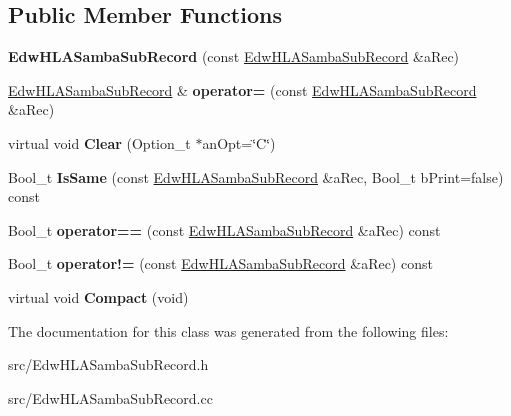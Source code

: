 \subsection*{Public Member Functions}
\begin{DoxyCompactItemize}
\item 
\hypertarget{class_edw_h_l_a_samba_sub_record_a42fa97a57160c365e2309866e46c6986}{
{\bfseries EdwHLASambaSubRecord} (const \hyperlink{class_edw_h_l_a_samba_sub_record}{EdwHLASambaSubRecord} \&aRec)}
\label{class_edw_h_l_a_samba_sub_record_a42fa97a57160c365e2309866e46c6986}

\item 
\hypertarget{class_edw_h_l_a_samba_sub_record_a88374b44b2522626b0dca8b9eec053c6}{
\hyperlink{class_edw_h_l_a_samba_sub_record}{EdwHLASambaSubRecord} \& {\bfseries operator=} (const \hyperlink{class_edw_h_l_a_samba_sub_record}{EdwHLASambaSubRecord} \&aRec)}
\label{class_edw_h_l_a_samba_sub_record_a88374b44b2522626b0dca8b9eec053c6}

\item 
\hypertarget{class_edw_h_l_a_samba_sub_record_a265688e7ce89606b981957bf6ac3acb5}{
virtual void {\bfseries Clear} (Option\_\-t $\ast$anOpt=\char`\"{}C\char`\"{})}
\label{class_edw_h_l_a_samba_sub_record_a265688e7ce89606b981957bf6ac3acb5}

\item 
\hypertarget{class_edw_h_l_a_samba_sub_record_a74965b85f1c9782fc5260badd87c91af}{
Bool\_\-t {\bfseries IsSame} (const \hyperlink{class_edw_h_l_a_samba_sub_record}{EdwHLASambaSubRecord} \&aRec, Bool\_\-t bPrint=false) const }
\label{class_edw_h_l_a_samba_sub_record_a74965b85f1c9782fc5260badd87c91af}

\item 
\hypertarget{class_edw_h_l_a_samba_sub_record_a78615ac3f95ed3df5a0bcafabc2c1b11}{
Bool\_\-t {\bfseries operator==} (const \hyperlink{class_edw_h_l_a_samba_sub_record}{EdwHLASambaSubRecord} \&aRec) const }
\label{class_edw_h_l_a_samba_sub_record_a78615ac3f95ed3df5a0bcafabc2c1b11}

\item 
\hypertarget{class_edw_h_l_a_samba_sub_record_a053a38ee6e024cd83bc600e1cccf17d8}{
Bool\_\-t {\bfseries operator!=} (const \hyperlink{class_edw_h_l_a_samba_sub_record}{EdwHLASambaSubRecord} \&aRec) const }
\label{class_edw_h_l_a_samba_sub_record_a053a38ee6e024cd83bc600e1cccf17d8}

\item 
\hypertarget{class_edw_h_l_a_samba_sub_record_a3ba4a23ad3834d84c1d54d0efd53e39a}{
virtual void {\bfseries Compact} (void)}
\label{class_edw_h_l_a_samba_sub_record_a3ba4a23ad3834d84c1d54d0efd53e39a}

\end{DoxyCompactItemize}


The documentation for this class was generated from the following files:\begin{DoxyCompactItemize}
\item 
src/EdwHLASambaSubRecord.h\item 
src/EdwHLASambaSubRecord.cc\end{DoxyCompactItemize}
